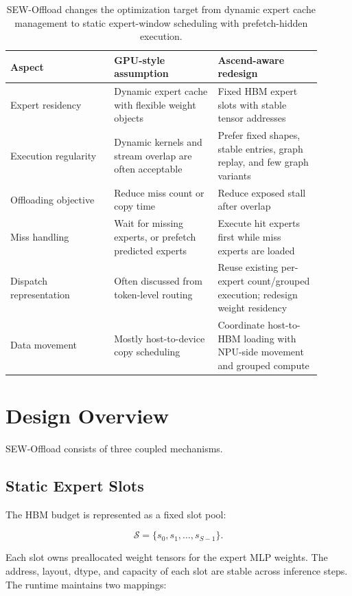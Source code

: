 \documentclass[10pt]{article}
\begin{document}
\begin{table}[h]
\centering
\small
\begin{tabular}{p{0.30\linewidth}p{0.30\linewidth}p{0.30\linewidth}}
\toprule
Aspect & GPU-style assumption & Ascend-aware redesign \\
\midrule
Expert residency &
Dynamic expert cache with flexible weight objects &
Fixed HBM expert slots with stable tensor addresses \\
Execution regularity &
Dynamic kernels and stream overlap are often acceptable &
Prefer fixed shapes, stable entries, graph replay, and few graph variants \\
Offloading objective &
Reduce miss count or copy time &
Reduce exposed stall after overlap \\
Miss handling &
Wait for missing experts, or prefetch predicted experts &
Execute hit experts first while miss experts are loaded \\
Dispatch representation &
Often discussed from token-level routing &
Reuse existing per-expert count/grouped execution; redesign weight residency \\
Data movement &
Mostly host-to-device copy scheduling &
Coordinate host-to-HBM loading with NPU-side movement and grouped compute \\
\bottomrule
\end{tabular}
\caption{SEW-Offload changes the optimization target from dynamic expert cache
management to static expert-window scheduling with prefetch-hidden execution.}
\label{tab:assumptions}
\end{table}

\section{Design Overview}

SEW-Offload consists of three coupled mechanisms.

\subsection{Static Expert Slots}

The HBM budget is represented as a fixed slot pool:

\[
\mathcal{S} = \{s_0, s_1, \ldots, s_{S-1}\}.
\]

Each slot owns preallocated weight tensors for the expert MLP weights. The
address, layout, dtype, and capacity of each slot are stable across inference
steps. The runtime maintains two mappings:
\end{document}
